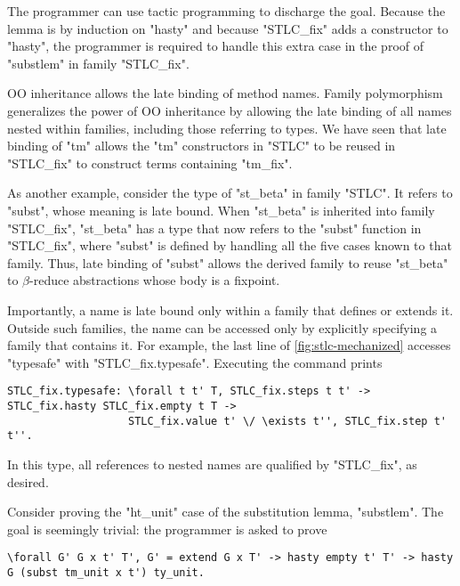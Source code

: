 \noindent
The programmer can use tactic programming to discharge the goal.
Because the lemma is by induction on "hasty" and because "STLC_fix" adds
a constructor to "hasty", the programmer is required to handle this extra case
in the proof of "substlem" in family "STLC_fix".



OO inheritance allows the late binding of method names.
Family polymorphism generalizes the power of OO inheritance by allowing the
late binding of all names nested within families, including those referring to types.
We have seen that late binding of "tm" allows the "tm" constructors in "STLC"
to be reused in "STLC_fix" to construct terms containing "tm_fix".

As another example, consider the type of "st_beta" in family "STLC".
It refers to "subst", whose meaning is late bound.
When "st_beta" is inherited into family "STLC_fix", "st_beta" has a type that now
refers to the "subst" function in "STLC_fix", where "subst" is defined
by handling all the five cases known to that family.
Thus, late binding of "subst" allows the derived family to reuse "st_beta"
to $\beta$-reduce abstractions whose body is a fixpoint.

Importantly, a name is late bound only within a family that defines or extends it.
Outside such families, the name can be accessed only by explicitly
specifying a family that contains it.
For example, the last line of \cref{fig:stlc-mechanized} accesses "typesafe"
with "STLC_fix.typesafe".
Executing the command prints

\begin{lstlisting}[basicstyle=\fontsize{8.25}{9}\ttfamily]
STLC_fix.typesafe: \forall t t' T, STLC_fix.steps t t' -> STLC_fix.hasty STLC_fix.empty t T ->
                   STLC_fix.value t' \/ \exists t'', STLC_fix.step t' t''.
\end{lstlisting}

\noindent
In this type, all references to nested names are qualified by "STLC_fix", as desired.



Consider proving the "ht_unit" case of the substitution lemma, "substlem".
The goal is seemingly trivial: the programmer is asked to prove

\begin{lstlisting}[basicstyle=\fontsize{8.25}{9}\ttfamily]
\forall G' G x t' T', G' = extend G x T' -> hasty empty t' T' -> hasty G (subst tm_unit x t') ty_unit.
\end{lstlisting}

